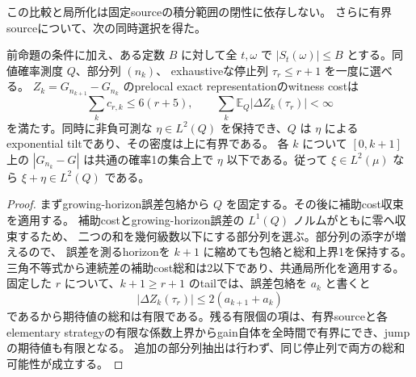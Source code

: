 この比較と局所化は固定sourceの積分範囲の閉性に依存しない。
さらに有界sourceについて、次の同時選択を得た。

\begin{proposition}\label{prop:joint-costs}
前命題の条件に加え、ある定数 $B$ に対して全 $t,\omega$ で
$|S_t(\omega)|\le B$ とする。同値確率測度 $Q$、部分列 $(n_k)$、
exhaustiveな停止列 $\tau_r\le r+1$ を一度に選べる。
$Z_k=G_{n_{k+1}}-G_{n_k}$ のprelocal exact representationのwitness costは
\[
 \sum_k c_{r,k}\le6(r+5),\qquad
 \sum_k\mathbb E_Q|\Delta Z_k(\tau_r)|<\infty
\]
を満たす。同時に非負可測な $\eta\in L^2(Q)$ を保持でき、$Q$ は $\eta$ による
exponential tiltであり、その密度は上に有界である。
各 $k$ について $[0,k+1]$ 上の $|G_{n_k}-G|$ は共通の確率1の集合上で
$\eta$ 以下である。従って $\xi\in L^2(\mu)$ なら $\xi+\eta\in L^2(Q)$ である。
\end{proposition}
\begin{proof}
まずgrowing-horizon誤差包絡から $Q$ を固定する。その後に補助cost収束を適用する。
補助costとgrowing-horizon誤差の $L^1(Q)$ ノルムがともに零へ収束するため、
二つの和を幾何級数以下にする部分列を選ぶ。部分列の添字が増えるので、
誤差を測るhorizonを $k+1$ に縮めても包絡と総和上界1を保持する。
三角不等式から連続差の補助cost総和は2以下であり、共通局所化を適用する。
固定した $r$ について、$k+1\ge r+1$ のtailでは、誤差包絡を $a_k$ と書くと
\[
 |\Delta Z_k(\tau_r)|\le2(a_{k+1}+a_k)
\]
であるから期待値の総和は有限である。残る有限個の項は、有界sourceと各elementary
strategyの有限な係数上界からgain自体を全時間で有界にでき、jumpの期待値も有限となる。
追加の部分列抽出は行わず、同じ停止列で両方の総和可能性が成立する。
\end{proof}

